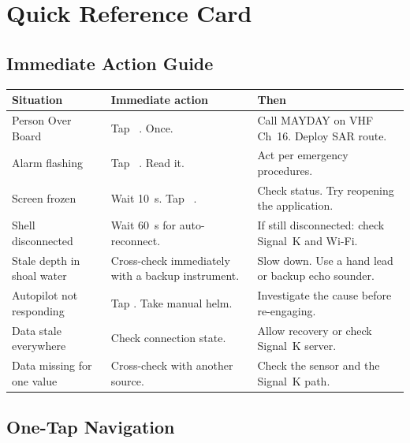 \chapter{Quick Reference Card}
\label{ch:quickref}

\section*{Immediate Action Guide}

\begin{longtable}{L{3.6cm}L{4.4cm}L{5.7cm}}
\toprule
{}
\color{white}\sffamily\bfseries Situation &
\color{white}\sffamily\bfseries Immediate action &
\color{white}\sffamily\bfseries Then \\
\midrule
Person Over Board &
  Tap ~. Once. &
  Call MAYDAY on VHF Ch~16. Deploy SAR route. \\
Alarm flashing &
  Tap ~. Read it. &
  Act per emergency procedures. \\
Screen frozen &
  Wait 10~s. Tap ~. &
  Check status. Try reopening the application. \\
Shell disconnected &
  Wait 60~s for auto-reconnect. &
  If still disconnected: check Signal~K and Wi-Fi. \\
Stale depth in shoal water &
  Cross-check immediately with a backup instrument. &
  Slow down. Use a hand lead or backup echo sounder. \\
Autopilot not responding &
  Tap . Take manual helm. &
  Investigate the cause before re-engaging. \\
Data stale everywhere &
  Check connection state. &
  Allow recovery or check Signal~K server. \\
Data missing for one value &
  Cross-check with another source. &
  Check the sensor and the Signal~K path. \\
\bottomrule
\end{longtable}

\section*{One-Tap Navigation}

